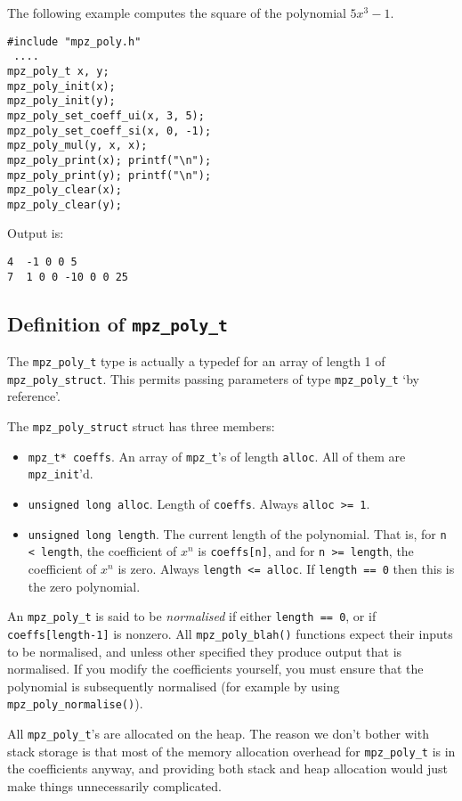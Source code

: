 \documentclass[a4paper,10pt]{article}
\newcommand{\code}{\lstinline}
\begin{document}
The following example computes the square of the polynomial $5x^3 - 1$.

\begin{lstlisting}
#include "mpz_poly.h"
 ....
mpz_poly_t x, y;
mpz_poly_init(x);
mpz_poly_init(y);
mpz_poly_set_coeff_ui(x, 3, 5);
mpz_poly_set_coeff_si(x, 0, -1);
mpz_poly_mul(y, x, x);
mpz_poly_print(x); printf("\n");
mpz_poly_print(y); printf("\n");
mpz_poly_clear(x);
mpz_poly_clear(y);
\end{lstlisting}

Output is:

\begin{lstlisting}
4  -1 0 0 5
7  1 0 0 -10 0 0 25
\end{lstlisting}

\subsection{Definition of \code{mpz_poly_t}}

The \code{mpz_poly_t} type is actually a typedef for an array of length 1 of \code{mpz_poly_struct}. This permits passing parameters  of type \code{mpz_poly_t} `by reference'.

The \code{mpz_poly_struct} struct has three members:
\begin{itemize}
\item \code{mpz_t* coeffs}. An array of \code{mpz_t}'s of length \code{alloc}. All of them are \code{mpz_init}'d.
\item \code{unsigned long alloc}. Length of \code{coeffs}. Always \code{alloc >= 1}.
\item \code{unsigned long length}. The current length of the polynomial. That is, for \code{n < length}, the coefficient of $x^n$ is \code{coeffs[n]}, and for \code{n >= length}, the coefficient of $x^n$ is zero. Always \code{length <= alloc}. If \code{length == 0} then this is the zero polynomial. 
\end{itemize}

An \code{mpz_poly_t} is said to be \emph{normalised} if either \code{length == 0}, or if \code{coeffs[length-1]} is nonzero. All \code{mpz_poly_blah()} functions expect their inputs to be normalised, and unless other specified they produce output that is normalised. If you modify the coefficients yourself, you must ensure that the polynomial is subsequently normalised (for example by using \code{mpz_poly_normalise()}).

All \code{mpz_poly_t}'s are allocated on the heap. The reason we don't bother with stack storage is that most of the memory allocation overhead for \code{mpz_poly_t} is in the coefficients anyway, and providing both stack and heap allocation would just make things unnecessarily complicated.
\end{document}
